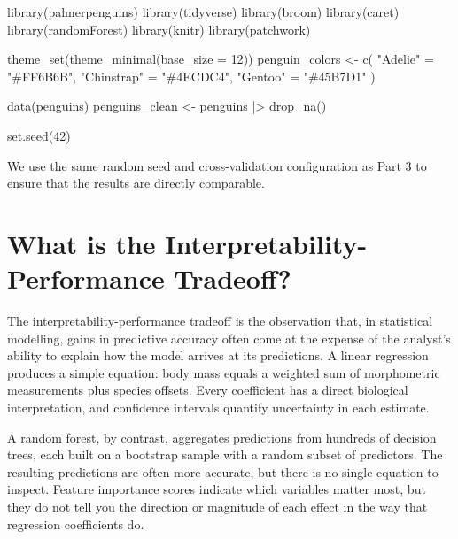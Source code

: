 \documentclass[
  letterpaper,
  DIV=11,
  numbers=noendperiod]{scrartcl}
\newenvironment{Shaded}{\begin{snugshade}}{\end{snugshade}}
\newcommand{\AttributeTok}[1]{\textcolor[rgb]{0.40,0.45,0.13}{#1}}
\newcommand{\DecValTok}[1]{\textcolor[rgb]{0.68,0.00,0.00}{#1}}
\newcommand{\FunctionTok}[1]{\textcolor[rgb]{0.28,0.35,0.67}{#1}}
\newcommand{\NormalTok}[1]{\textcolor[rgb]{0.00,0.23,0.31}{#1}}
\newcommand{\OtherTok}[1]{\textcolor[rgb]{0.00,0.23,0.31}{#1}}
\newcommand{\SpecialCharTok}[1]{\textcolor[rgb]{0.37,0.37,0.37}{#1}}
\newcommand{\StringTok}[1]{\textcolor[rgb]{0.13,0.47,0.30}{#1}}
\begin{document}
\begin{Shaded}
\begin{Highlighting}[]
\FunctionTok{library}\NormalTok{(palmerpenguins)}
\FunctionTok{library}\NormalTok{(tidyverse)}
\FunctionTok{library}\NormalTok{(broom)}
\FunctionTok{library}\NormalTok{(caret)}
\FunctionTok{library}\NormalTok{(randomForest)}
\FunctionTok{library}\NormalTok{(knitr)}
\FunctionTok{library}\NormalTok{(patchwork)}

\FunctionTok{theme\_set}\NormalTok{(}\FunctionTok{theme\_minimal}\NormalTok{(}\AttributeTok{base\_size =} \DecValTok{12}\NormalTok{))}
\NormalTok{penguin\_colors }\OtherTok{\textless{}{-}} \FunctionTok{c}\NormalTok{(}
  \StringTok{"Adelie"} \OtherTok{=} \StringTok{"\#FF6B6B"}\NormalTok{,}
  \StringTok{"Chinstrap"} \OtherTok{=} \StringTok{"\#4ECDC4"}\NormalTok{,}
  \StringTok{"Gentoo"} \OtherTok{=} \StringTok{"\#45B7D1"}
\NormalTok{)}

\FunctionTok{data}\NormalTok{(penguins)}
\NormalTok{penguins\_clean }\OtherTok{\textless{}{-}}\NormalTok{ penguins }\SpecialCharTok{|\textgreater{}} \FunctionTok{drop\_na}\NormalTok{()}

\FunctionTok{set.seed}\NormalTok{(}\DecValTok{42}\NormalTok{)}
\end{Highlighting}
\end{Shaded}

We use the same random seed and cross-validation configuration as Part 3
to ensure that the results are directly comparable.

\section{What is the Interpretability-Performance
Tradeoff?}\label{what-is-the-interpretability-performance-tradeoff}

The interpretability-performance tradeoff is the observation that, in
statistical modelling, gains in predictive accuracy often come at the
expense of the analyst's ability to explain how the model arrives at its
predictions. A linear regression produces a simple equation: body mass
equals a weighted sum of morphometric measurements plus species offsets.
Every coefficient has a direct biological interpretation, and confidence
intervals quantify uncertainty in each estimate.

A random forest, by contrast, aggregates predictions from hundreds of
decision trees, each built on a bootstrap sample with a random subset of
predictors. The resulting predictions are often more accurate, but there
is no single equation to inspect. Feature importance scores indicate
which variables matter most, but they do not tell you the direction or
magnitude of each effect in the way that regression coefficients do.
\end{document}
